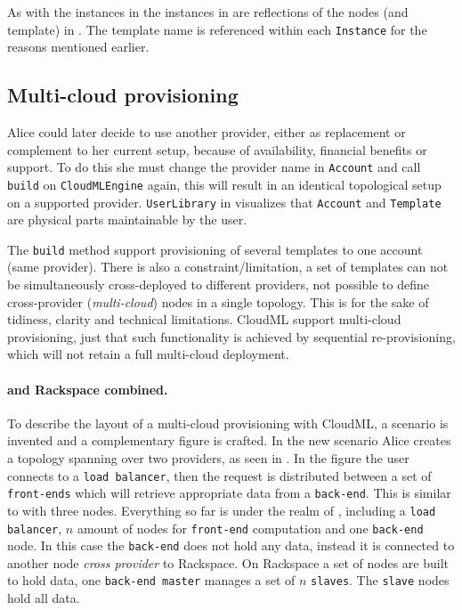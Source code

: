 As with the instances in  the instances in 
are reflections of the nodes (and template) in .
The template name is referenced within each \texttt{Instance} 
for the reasons mentioned earlier.

\subsection{Multi-cloud provisioning}

Alice could later decide to use another provider, either as replacement or complement to her current setup,
because of availability, financial benefits or support.
To do this she must change the provider name in \texttt{Account} and call \texttt{build} on \texttt{CloudMLEngine} again,
this will result in an identical topological setup on a supported provider.
\texttt{UserLibrary} in  visualizes that \texttt{Account} and \texttt{Template} are 
physical parts maintainable by the user.

The \texttt{build} method support provisioning of several templates to one account (same provider).
There is also a constraint/limitation, a set of templates can not be simultaneously 
cross-deployed to different providers,
\ie not possible to define cross-provider (\emph{multi-cloud}) nodes in a single topology.
This is for the sake of tidiness, clarity and technical limitations.
CloudML support multi-cloud provisioning,
just that such functionality is achieved by sequential re-provisioning,
which will not retain a full multi-cloud deployment.

\paragraph{ and Rackspace combined.}


To describe the layout of a multi-cloud provisioning with CloudML,
a scenario is invented and a complementary figure is crafted.
In the new scenario Alice creates a topology spanning over two providers,
as seen in .
In the figure the user connects to a \texttt{load balancer}, 
then the request is distributed between a set of \texttt{front-ends} which will 
retrieve appropriate data from a \texttt{back-end}.
This is similar to  with three nodes.
Everything so far is under the realm of ,
including a \texttt{load balancer}, $n$ amount of nodes for \texttt{front-end} computation
and one \texttt{back-end} node.
In this case the \texttt{back-end} does not hold any data, instead it is connected
to another node \emph{cross provider} to Rackspace.
On Rackspace a set of nodes are built to hold data,
one \texttt{back-end master} manages a set of $n$ \texttt{slaves}.
The \texttt{slave} nodes hold all data.

